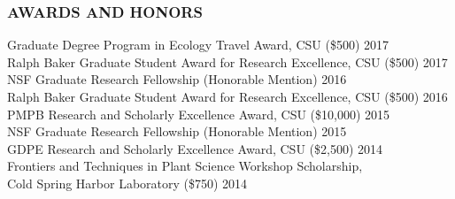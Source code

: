 \documentclass[12pt,english]{article}
\begin{document}
\subsubsection*{AWARDS AND HONORS}
\vspace{-0.5ex}
\hspace*{1.0em} Graduate Degree Program in Ecology Travel Award, CSU (\$500)
\hfill
2017
\vspace{1ex}\\
\hspace*{1.0em} Ralph Baker Graduate Student Award for Research Excellence, CSU (\$500)
\hfill
2017
\vspace{1ex}\\
\hspace*{1.0em} NSF Graduate Research Fellowship (Honorable Mention)
\hfill
2016
\vspace{1ex}\\
\hspace*{1.0em} Ralph Baker Graduate Student Award for Research Excellence, CSU (\$500)
\hfill
2016
\vspace{1ex}\\
\hspace*{1.0em} PMPB Research and Scholarly Excellence Award, CSU (\$10,000)
\hfill
2015
\vspace{1ex}\\
\hspace*{1.0em} NSF Graduate Research Fellowship (Honorable Mention)
\hfill
2015
\vspace{1ex}\\
\hspace*{1.0em} GDPE Research and Scholarly Excellence Award, CSU (\$2,500)
\hfill
2014
\vspace{1ex}\\
\hspace*{1.0em}  Frontiers and Techniques in Plant Science Workshop Scholarship,\\
\hspace*{1.0em} Cold Spring Harbor Laboratory   (\$750)
\hfill
2014
\vspace{1ex}


\end{document}
